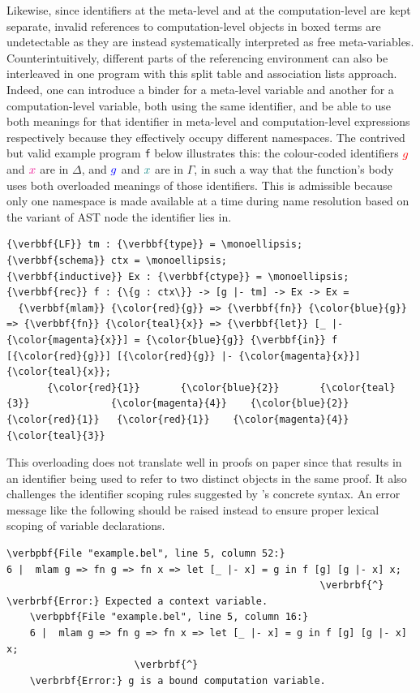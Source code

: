 Likewise, since identifiers at the meta-level and at the computation-level are kept separate, invalid references to computation-level objects in boxed terms are undetectable as they are instead systematically interpreted as free meta-variables.
Counterintuitively, different parts of the referencing environment can also be interleaved in one program with this split table and association lists approach.
Indeed, one can introduce a binder for a meta-level variable and another for a computation-level variable, both using the same identifier, and be able to use both meanings for that identifier in meta-level and computation-level expressions respectively because they effectively occupy different namespaces.
The contrived but valid example program \verb*|f| below illustrates this: the colour-coded identifiers ${\color{red}{g}}$ and ${\color{magenta}{x}}$ are in $\Delta$, and ${\color{blue}{g}}$ and ${\color{teal}{x}}$ are in $\Gamma$, in such a way that the function's body uses both overloaded meanings of those identifiers.
This is admissible because only one namespace is made available at a time during name resolution based on the variant of \ac{AST} node the identifier lies in.
\bigskip
\begin{Verbatim}[commandchars=\\\{\}, baselinestretch=1]
{\verbbf{LF}} tm : {\verbbf{type}} = \monoellipsis;
{\verbbf{schema}} ctx = \monoellipsis;
{\verbbf{inductive}} Ex : {\verbbf{ctype}} = \monoellipsis;
{\verbbf{rec}} f : {\{g : ctx\}} -> [g |- tm] -> Ex -> Ex =
  {\verbbf{mlam}} {\color{red}{g}} => {\verbbf{fn}} {\color{blue}{g}} => {\verbbf{fn}} {\color{teal}{x}} => {\verbbf{let}} [_ |- {\color{magenta}{x}}] = {\color{blue}{g}} {\verbbf{in}} f [{\color{red}{g}}] [{\color{red}{g}} |- {\color{magenta}{x}}] {\color{teal}{x}};
       {\color{red}{1}}       {\color{blue}{2}}       {\color{teal}{3}}              {\color{magenta}{4}}    {\color{blue}{2}}       {\color{red}{1}}   {\color{red}{1}}    {\color{magenta}{4}}  {\color{teal}{3}}
\end{Verbatim}
This overloading does not translate well in proofs on paper since that results in an identifier being used to refer to two distinct objects in the same proof.
It also challenges the identifier scoping rules suggested by \Beluga's concrete syntax.
An error message like the following should be raised instead to ensure proper lexical scoping of variable declarations.
\bigskip
\begingroup
\samepage
\begin{Verbatim}[commandchars=\\\{\}, baselinestretch=1]
\verbpbf{File "example.bel", line 5, column 52:}
6 |  mlam g => fn g => fn x => let [_ |- x] = g in f [g] [g |- x] x;
                                                      \verbrbf{^}
\verbrbf{Error:} Expected a context variable.
    \verbpbf{File "example.bel", line 5, column 16:}
    6 |  mlam g => fn g => fn x => let [_ |- x] = g in f [g] [g |- x] x;
                      \verbrbf{^}
    \verbrbf{Error:} g is a bound computation variable.
\end{Verbatim}
\endgroup

